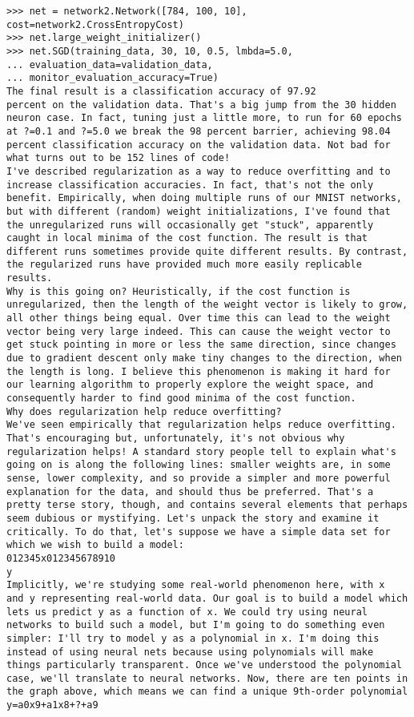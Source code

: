\begin{lstlisting}
>>> net = network2.Network([784, 100, 10], cost=network2.CrossEntropyCost)
>>> net.large_weight_initializer()
>>> net.SGD(training_data, 30, 10, 0.5, lmbda=5.0,
... evaluation_data=validation_data,
... monitor_evaluation_accuracy=True)
The final result is a classification accuracy of 97.92
percent on the validation data. That's a big jump from the 30 hidden neuron case. In fact, tuning just a little more, to run for 60 epochs at ?=0.1 and ?=5.0 we break the 98 percent barrier, achieving 98.04
percent classification accuracy on the validation data. Not bad for what turns out to be 152 lines of code!
I've described regularization as a way to reduce overfitting and to increase classification accuracies. In fact, that's not the only benefit. Empirically, when doing multiple runs of our MNIST networks, but with different (random) weight initializations, I've found that the unregularized runs will occasionally get "stuck", apparently caught in local minima of the cost function. The result is that different runs sometimes provide quite different results. By contrast, the regularized runs have provided much more easily replicable results.
Why is this going on? Heuristically, if the cost function is unregularized, then the length of the weight vector is likely to grow, all other things being equal. Over time this can lead to the weight vector being very large indeed. This can cause the weight vector to get stuck pointing in more or less the same direction, since changes due to gradient descent only make tiny changes to the direction, when the length is long. I believe this phenomenon is making it hard for our learning algorithm to properly explore the weight space, and consequently harder to find good minima of the cost function.
Why does regularization help reduce overfitting?
We've seen empirically that regularization helps reduce overfitting. That's encouraging but, unfortunately, it's not obvious why regularization helps! A standard story people tell to explain what's going on is along the following lines: smaller weights are, in some sense, lower complexity, and so provide a simpler and more powerful explanation for the data, and should thus be preferred. That's a pretty terse story, though, and contains several elements that perhaps seem dubious or mystifying. Let's unpack the story and examine it critically. To do that, let's suppose we have a simple data set for which we wish to build a model:
012345x012345678910
y
Implicitly, we're studying some real-world phenomenon here, with x
and y representing real-world data. Our goal is to build a model which lets us predict y as a function of x. We could try using neural networks to build such a model, but I'm going to do something even simpler: I'll try to model y as a polynomial in x. I'm doing this instead of using neural nets because using polynomials will make things particularly transparent. Once we've understood the polynomial case, we'll translate to neural networks. Now, there are ten points in the graph above, which means we can find a unique 9th-order polynomial y=a0x9+a1x8+?+a9

\end{lstlisting}
